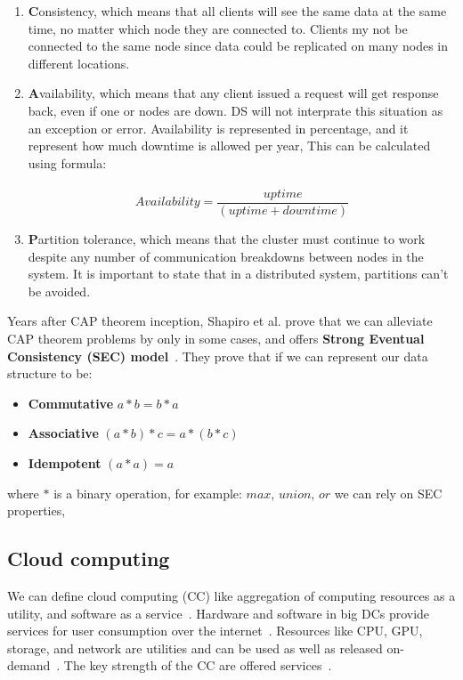 \begin{enumerate} [start=1,label={(\bfseries \arabic*)}]
	\item \textbf{C}onsistency, which means that all clients will see the same data at the same time, no matter which node they are connected to. Clients my not be connected to the same node since data could be replicated on many nodes in different locations.
	\item \textbf{A}vailability, which means that any client issued a request will get response back, even if one or nodes are down. DS will not interprate this situation as an exception or error. Availability is represented in percentage, and it represent how much downtime is allowed per year, This can be calculated using formula:\\\\ 
	\begin{equation}\label{eq:Availability}
		Availability = \frac{uptime}{ (uptime + downtime)}
	\end{equation}
	\item \textbf{P}artition tolerance, which means that the cluster must continue to work despite any number of communication breakdowns between nodes in the system. It is important to state that in a distributed system, partitions can’t be avoided.
\end{enumerate}

Years after CAP theorem inception, Shapiro et al. prove that we can alleviate CAP theorem problems by only in some cases, and offers \textbf{Strong Eventual Consistency (SEC) model}~\cite{ShapiroPBZ11}. They prove that if we can represent our data structure to be:

\begin{itemize}
	\item \textbf{Commutative} $a*b = b*a$
	\item \textbf{Associative} $(a*b)*c = a*(b*c)$
	\item \textbf{Idempotent} $(a * a) = a$
\end{itemize}

\noindent
where $*$ is a binary operation, for example: $max$, $union$, $or$ we can rely on SEC properties,
%
%
\subsection{Cloud computing}\label{sec:cloud_computing}
%
We can define cloud computing (CC) like aggregation of computing resources as a utility, and software as a service~\cite{Vogels}. Hardware and software in big DCs provide services for user consumption over the internet~\cite{AboveTheCloud}. Resources like CPU, GPU, storage, and network are utilities and can be used as well as released on-demand~\cite{ZhangCB10}. The key strength of the CC are offered services~\cite{Vogels}. 


